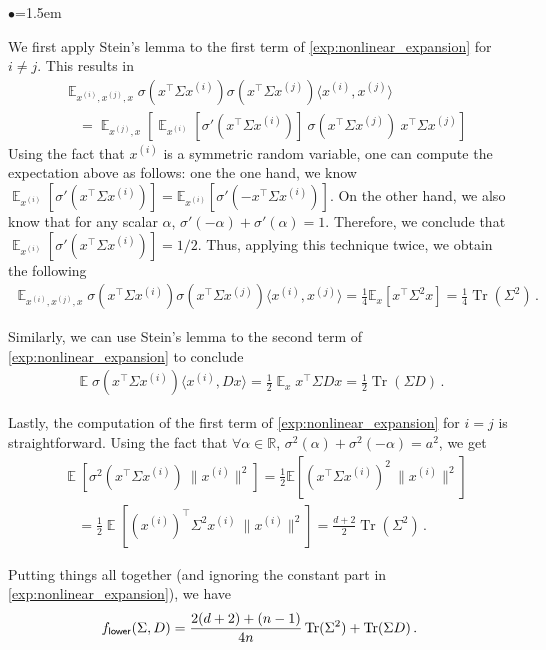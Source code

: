 \documentclass{article}
\DeclareMathOperator{\E}{\mathbb{E}}
\newcommand{\R}{\mathbb{R}}
\newcommand{\relu}{\sigma}
\newcommand{\tx}[1]{x^{(#1)}}
\newcommand{\ttf}{f_{\sf lower}}
\DeclareMathOperator{\tr}{Tr}
\newcommand{\inpp}[2]{ \langle #1,#2\rangle}
\begin{document}
\begin{list}{$\bullet$}{\leftmargin=1.5em}
\setlength{\itemsep}{1pt}
\item 
We first apply Stein's lemma  to the first term of \eqref{exp:nonlinear_expansion} for $i\neq j$. This results in 
\begin{align}
&\E_{\tx{i},\tx{j},x}\relu (x^\top \Sigma \tx{i}  )  \relu (x^\top \Sigma \tx{j}  )  \inpp{\tx{i}}{\tx{j}}  \\
&\quad =   \E_{\tx{j},x} [\E_{\tx{i}} [\relu'(x^\top \Sigma \tx{i})] \ \relu(x^\top \Sigma \tx{j}) \ x^\top \Sigma x^{(j)}] 
\end{align} 
Using  the fact that $\tx{i}$ is a symmetric random variable, one can compute the expectation above as follows: one the one hand, we know  $\E_{\tx{i}} [\relu'(x^\top \Sigma \tx{i})] = \mathbb{E}_{\tx{i}} [\relu'(-x^\top \Sigma \tx{i})]$.  On the other hand, we also know that for any scalar $\alpha$, $\relu'(-\alpha)+ \relu'(\alpha) =1$. Therefore, we conclude that  $\E_{\tx{i}} [\relu'(x^\top \Sigma \tx{i})] = 1/2$. Thus, applying this technique twice, we obtain the following
\begin{align}
\E_{\tx{i},\tx{j},x}\relu (x^\top \Sigma \tx{i}  )  \relu (x^\top \Sigma \tx{j}  )  \inpp{\tx{i}}{\tx{j}}  =  \frac{1}{4}\mathbb{E}_{ x} [ x^\top \Sigma^2 x  ] = \frac{1}{4} \tr(\Sigma^2)\,.
\end{align}

\item 
Similarly, we can use Stein's lemma to the second term of \eqref{exp:nonlinear_expansion} to conclude
\begin{align}
    \E \relu (x^\top \Sigma \tx{i}  )  \inpp{\tx{i}}{Dx} = \frac{1}{2}\E_x x^\top \Sigma D x =  \frac{1}{2}\tr(\Sigma D)\,.
\end{align} 

\item Lastly, the computation of the first term of \eqref{exp:nonlinear_expansion} for $i=j$ is straightforward.
Using the fact that $\forall \alpha\in\R$, $\relu^2(\alpha)+\relu^2(-\alpha) = a^2$, we get 
\begin{align}
    &\E \left[ \relu^2(x^\top \Sigma \tx{i}) \ \|\tx{i} \|^2 \right] = \frac{1}{2} \mathbb{E} [(x^\top \Sigma \tx{i})^2 \ \| \tx{i}\|^2 ]\\
    &\quad = \frac{1}{2}\E \left[ (\tx{i})^\top \Sigma^2 \tx{i} \ \| \tx{i} \|^2 \right] = \frac{d+2}{2} \tr(\Sigma^2)\,.
\end{align}
\end{list}
Putting things all together (and ignoring the constant part in \eqref{exp:nonlinear_expansion}), we have 
\begin{align}\label{exp:lower}
     \ttf(\Sigma, D) = \frac{2(d+2) + (n-1)}{4n} \tr(\Sigma^2) + \tr(\Sigma D)\,.
\end{align}
\end{document}
